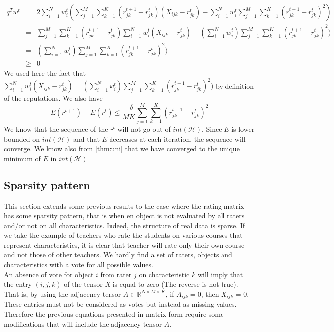 \documentclass[12pt,a4paper]{article}
\begin{document}
\begin{eqnarray*}
q^Tw^t & = & 2 \sum_{i=1}^N w^t_i (\sum_{j=1}^M \sum_{k=1}^K (r^{t+1}_{jk}-r^t_{jk})(X_{ijk}-r^t_{jk}) - \sum_{i=1}^N w^t_i \sum_{j=1}^M \sum_{k=1}^K  (r^{t+1}_{jk} - r^t_{jk})^2)\\
& = & \sum_{j=1}^M \sum_{k=1}^K (r^{t+1}_{jk}-r^t_{jk}) \sum_{i=1}^N w^t_i (X_{ijk}-r_{jk}^t)- (\sum_{i=1}^N w^t_i) \sum_{j=1}^M \sum_{k=1}^K  (r^{t+1}_{jk} - r^t_{jk})^2)\\
& = & (\sum_{i=1}^N w^t_i) \sum_{j=1}^M \sum_{k=1}^K  (r^{t+1}_{jk} - r^t_{jk})^2)\\
& \geq & 0
\end{eqnarray*}
We used here the fact that $\sum_{i=1}^N w^t_i (X_{ijk}-r_{jk}^t) = (\sum_{i=1}^N w^t_i) \sum_{j=1}^M \sum_{k=1}^K  (r^{t+1}_{jk} - r^t_{jk})^2)$ by definition of the reputations.
We also have 
$$E(r^{t+1})- E(r^t) \leq \frac{-\delta}{MK} \sum_{j=1}^M \sum_{k=1}^K (r^{t+1}_{jk} - r^t_{jk})^2$$
We know that the sequence of the $r^t$ will not go out of $int(\mathcal{H})$.
Since $E$ is lower bounded on $int(\mathcal{H})$ and that $E$ decreases at each iteration, the sequence will converge. We know also from \ref{thm:uni} that we have converged to the unique minimum of $E$ in $int(\mathcal{H})$





\subsection{Sparsity pattern}

This section extends some previous results to the case where the rating matrix has some sparsity pattern, that is when en object is not evaluated by all raters and/or not on all characteristics. Indeed, the structure of real data is sparse. If we take the example of teachers who rate the students on various courses that represent characteristics, it is clear that teacher will rate only their own course and not those of other teachers. We hardly find a set of raters, objects and characteristics with a vote for all possible values.\\

An absence of vote for object $i$ from rater $j$ on characteristic $k$ will imply that the entry $(i, j, k)$ of the tensor $X$ is equal to zero (The reverse is not true). That is, by using the adjacency tensor $A \in \mathbb{R}^{N \times M \times K}$, if $A_{ijk} = 0$, then $X_{ijk}$ = 0. These entries must not be considered as votes but instead as missing values. Therefore the previous equations presented in matrix form require some modifications that will include the adjacency tensor $A$.
\end{document}
